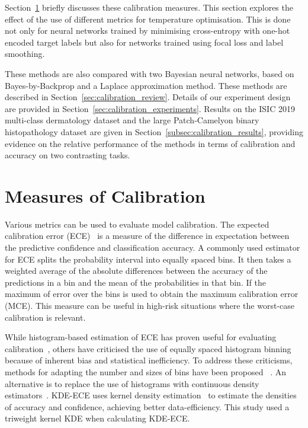 Section~\ref{sec:calibration_measures} briefly discusses these calibration measures. This section explores the effect of the use of different metrics for temperature optimisation. This is done not only for neural networks trained by minimising cross-entropy with one-hot encoded target labels but also for networks trained using focal loss and label smoothing. 

These methods are also compared with two Bayesian neural networks, based on Bayes-by-Backprop and a Laplace approximation method. These methods are described in Section~\ref{sec:calibration_review}. Details of our experiment design are provided in Section~\ref{sec:calibration_experiments}. Results on the ISIC 2019 multi-class dermatology dataset and the large Patch-Camelyon binary histopathology dataset are given in Section~\ref{subsec:calibration_results}, providing evidence on the relative performance of the methods in terms of calibration and accuracy on two contrasting tasks.



\section{Measures of Calibration}
\label{sec:calibration_measures}
Various metrics can be used to evaluate model calibration. The expected calibration error (ECE)~\citep{guo2017calibration} is a measure of the difference in expectation between the predictive confidence and classification accuracy. A commonly used estimator for ECE splits the probability interval into equally spaced bins. It then takes a weighted average of the absolute differences between the accuracy of the predictions in a bin and the mean of the probabilities in that bin. If the maximum of error over the bins is used to obtain the maximum calibration error (MCE). This measure can be useful in high-risk situations where the worst-case calibration is relevant. 

While histogram-based estimation of ECE has proven useful for evaluating calibration~\citep{muller2019does}, others have criticised the use of equally spaced histogram binning because of inherent bias and statistical inefficiency. To address these criticisms, methods for adapting the number and sizes of bins have been proposed ~\citep{roelofs2022mitigating}. An alternative is to replace the use of histograms with continuous density estimators~\citep{zhang2020mix}. KDE-ECE uses kernel density estimation~\citep{parzen1962estimation} to estimate the densities of accuracy and confidence, achieving better data-efficiency. This study used a triweight kernel KDE when calculating KDE-ECE.

